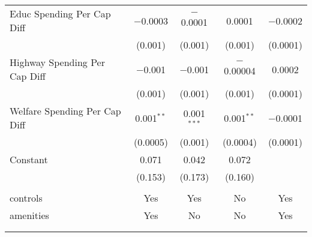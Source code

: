\begin{table}[!htbp]
\begin{tabular}{@{\extracolsep{5pt}}lcccc}
  Educ Spending Per Cap Diff & $-$0.0003 & $-$0.0001 & 0.0001 & $-$0.0002 \\ 
  & (0.001) & (0.001) & (0.001) & (0.0001) \\ 
  Highway Spending Per Cap Diff & $-$0.001 & $-$0.001 & $-$0.00004 & 0.0002 \\ 
  & (0.001) & (0.001) & (0.001) & (0.0001) \\ 
  Welfare Spending Per Cap Diff & 0.001$^{**}$ & 0.001$^{***}$ & 0.001$^{**}$ & $-$0.0001 \\ 
  & (0.0005) & (0.001) & (0.0004) & (0.0001) \\ 
  Constant & 0.071 & 0.042 & 0.072 &  \\ 
  & (0.153) & (0.173) & (0.160) &  \\ 
 \hline \\[-1.8ex] 
controls & Yes & Yes & No & Yes \\ 
amenities & Yes & No & No & Yes \\ 
\hline \\[-1.8ex] 
\hline 
\hline \\[-1.8ex] 
\end{tabular} 
\end{table} 
